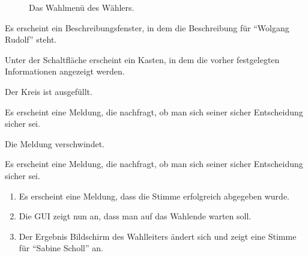 \documentclass[parskip=full]{scrartcl}
\begin{document}
\begin{figure}[h!]
	\caption{\label{fig:vot_vote}
		Das Wahlmenü des Wählers.
	}
\end{figure}

		{Es erscheint ein Beschreibungsfenster, in dem die Beschreibung für \enquote{Wolgang Rudolf} steht.}

		{Unter der Schaltfläche erscheint ein Kasten, in dem die vorher festgelegten Informationen angezeigt werden.}

		{Der Kreis ist ausgefüllt.}
	
		{Es erscheint eine Meldung, die nachfragt, ob man sich seiner sicher Entscheidung sicher sei.}

		{Die Meldung verschwindet.}
			
		{Es erscheint eine Meldung, die nachfragt, ob man sich seiner sicher Entscheidung sicher sei.}

		{\begin{enumerate}
			\item Es erscheint eine Meldung, dass die Stimme erfolgreich abgegeben wurde.
			\item Die GUI zeigt nun an, dass man auf das Wahlende warten soll.
			\item Der Ergebnis Bildschirm des Wahlleiters ändert sich und zeigt eine Stimme für \enquote{Sabine Scholl} an.
		\end{enumerate}}
	
\end{document}
